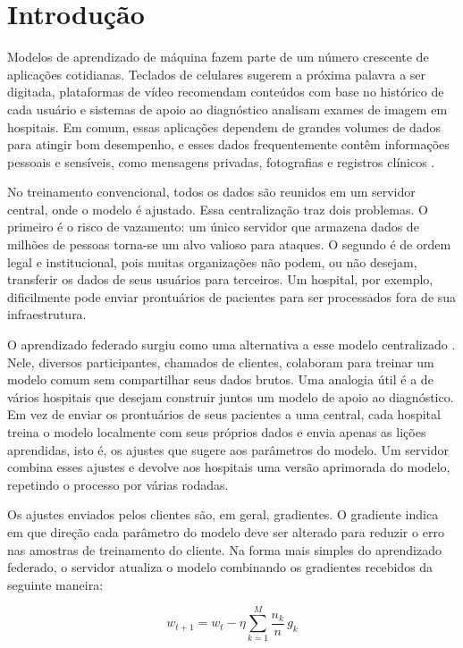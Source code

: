 \chapter{Introdução} \label{Introducao}

Modelos de aprendizado de máquina fazem parte de um número crescente de aplicações cotidianas. Teclados de celulares sugerem a próxima palavra a ser digitada, plataformas de vídeo recomendam conteúdos com base no histórico de cada usuário e sistemas de apoio ao diagnóstico analisam exames de imagem em hospitais. Em comum, essas aplicações dependem de grandes volumes de dados para atingir bom desempenho, e esses dados frequentemente contêm informações pessoais e sensíveis, como mensagens privadas, fotografias e registros clínicos \cite{Goodfellow2016}.

No treinamento convencional, todos os dados são reunidos em um servidor central, onde o modelo é ajustado. Essa centralização traz dois problemas. O primeiro é o risco de vazamento: um único servidor que armazena dados de milhões de pessoas torna-se um alvo valioso para ataques. O segundo é de ordem legal e institucional, pois muitas organizações não podem, ou não desejam, transferir os dados de seus usuários para terceiros. Um hospital, por exemplo, dificilmente pode enviar prontuários de pacientes para ser processados fora de sua infraestrutura.

O aprendizado federado surgiu como uma alternativa a esse modelo centralizado \cite{McMahan2017}. Nele, diversos participantes, chamados de clientes, colaboram para treinar um modelo comum sem compartilhar seus dados brutos. Uma analogia útil é a de vários hospitais que desejam construir juntos um modelo de apoio ao diagnóstico. Em vez de enviar os prontuários de seus pacientes a uma central, cada hospital treina o modelo localmente com seus próprios dados e envia apenas as lições aprendidas, isto é, os ajustes que sugere aos parâmetros do modelo. Um servidor combina esses ajustes e devolve aos hospitais uma versão aprimorada do modelo, repetindo o processo por várias rodadas.

Os ajustes enviados pelos clientes são, em geral, gradientes. O gradiente indica em que direção cada parâmetro do modelo deve ser alterado para reduzir o erro nas amostras de treinamento do cliente. Na forma mais simples do aprendizado federado, o servidor atualiza o modelo combinando os gradientes recebidos da seguinte maneira:

\begin{equation} \label{eq:intro-fedsgd}
w_{t+1} = w_t - \eta \sum_{k=1}^{M} \frac{n_k}{n} \, g_k
\end{equation}

